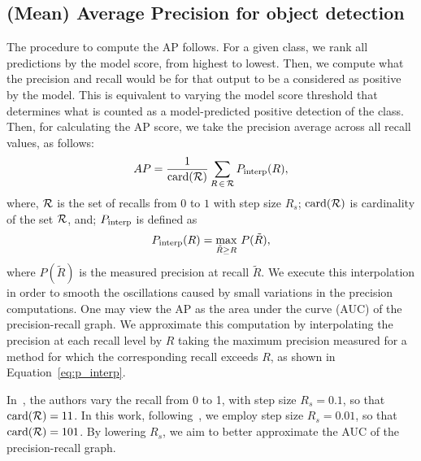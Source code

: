 \subsection{(Mean) Average Precision for object detection}
%
The procedure to compute the AP follows.
For a given class, we rank all predictions by the model score, from highest to lowest.
Then, we compute what the precision and recall would be for that output to be a considered as positive by the model.
This is equivalent to varying the model score threshold that determines what is counted as a model-predicted positive detection of the class.
Then, for calculating the AP score, we take the precision average across all recall values, as follows:
%
\begin{equation}
AP = \frac{1}{\operatorname*{\textrm{card}}(\mathcal{R})} \sum_{R\,\in\,\mathcal{R}}P_{\rm interp}(R),
\label{eq:AP}
\end{equation}
%
where, $\mathcal{R}$ is the set of recalls from $0$ to $1$ with step size $R_s$;
$\operatorname*{\textrm{card}}(\mathcal{R})$ is cardinality of the set $\mathcal{R}$, and;
$P_{\rm interp}$ is defined as
%
%
%
\begin{equation}
P_{\rm interp}(R) = \max_{\tilde{R} \geq R}\,{P(\tilde{R})},
\label{eq:p_interp}
\end{equation}
%
%
where ${P(\tilde{R})}$ is the measured precision at recall ${\tilde{R}}$.
We execute this interpolation in order to smooth the oscillations caused by small variations in the precision computations.
%
%
One may view the AP as the area under the curve (AUC) of the precision-recall graph.
We approximate this computation by interpolating the precision at each recall level by $R$ taking the maximum precision measured for a method for which the corresponding recall exceeds $R$, as shown in Equation~\eqref{eq:p_interp}.


In~\cite{Everingham10}, the authors vary the recall from 0 to 1, with step size $R_s=0.1$, so that $\operatorname*{\textrm{card}}(\mathcal{R})=11$.
In this work, following~\cite{He2017mask}, we employ step size $R_s=0.01$,  so that $\operatorname*{\textrm{card}}(\mathcal{R})=101$.
By lowering $R_s$, we aim to better approximate the AUC 
of the precision-recall graph.

